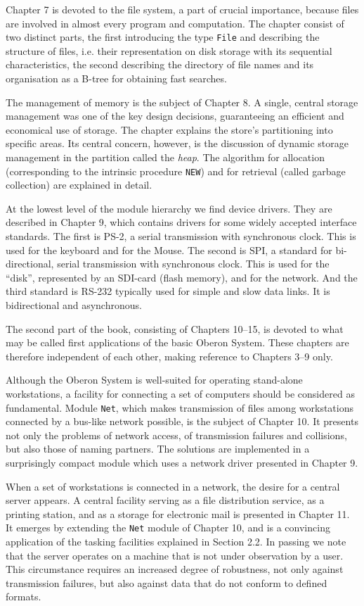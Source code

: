 Chapter 7 is devoted to the file system, a part of crucial importance,
because files are involved in almost every program and
computation. The chapter consist of two distinct parts, the first
introducing the type {\tt File\/} and describing the structure of files,
i.e. their representation on disk storage with its sequential
characteristics, the second describing the directory of file names and
its organisation as a B-tree for obtaining fast searches.

The management of memory is the subject of Chapter 8. A single,
central storage management was one of the key design decisions,
guaranteeing an efficient and economical use of storage. The chapter
explains the store's partitioning into specific areas. Its central
concern, however, is the discussion of dynamic storage management in
the partition called the {\it heap\/}. The algorithm for allocation
(corresponding to the intrinsic procedure {\tt NEW\/}) and for retrieval
(called garbage collection) are explained in detail.

At the lowest level of the module hierarchy we find device
drivers. They are described in Chapter 9, which contains drivers for
some widely accepted interface standards. The first is PS-2, a serial
transmission with synchronous clock. This is used for the keyboard and
for the Mouse. The second is SPI, a standard for bi-directional,
serial transmission with synchronous clock. This is used for the
``disk'', represented by an SDI-card (flash memory), and for the
network. And the third standard is RS-232 typically used for simple
and slow data links. It is bidirectional and asynchronous.

The second part of the book, consisting of Chapters 10--15, is
devoted to what may be called first applications of the basic Oberon
System. These chapters are therefore independent of each other, making
reference to Chapters 3--9 only.

Although the Oberon System is well-suited for operating stand-alone
workstations, a facility for connecting a set of computers should be
considered as fundamental. Module {\tt Net\/}, which makes transmission of
files among workstations connected by a bus-like network possible, is
the subject of Chapter 10. It presents not only the problems of
network access, of transmission failures and collisions, but also
those of naming partners. The solutions are implemented in a
surprisingly compact module which uses a network driver presented in
Chapter 9.

When a set of workstations is connected in a network, the desire for a
central server appears. A central facility serving as a file
distribution service, as a printing station, and as a storage for
electronic mail is presented in Chapter 11. It emerges by extending
the {\tt Net\/} module of Chapter 10, and is a convincing application of the
tasking facilities explained in Section 2.2. In passing we note that
the server operates on a machine that is not under observation by a
user. This circumstance requires an increased degree of robustness,
not only against transmission failures, but also against data that do
not conform to defined formats.

